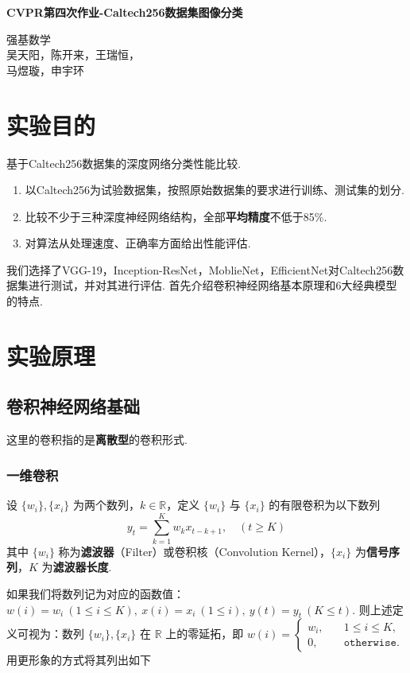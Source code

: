\documentclass[12pt, a4paper, oneside]{ctexart}
\numberwithin{equation}{section}  %
\newenvironment{myTitle}[1]{
    \begin{center}
    {\zihao{-2}\bf #1\\}
    \zihao{-4}\it
}{\end{center}}  %
\begin{document}
\begin{myTitle}{CVPR第四次作业-Caltech256数据集图像分类}
    强基数学\\
    吴天阳，陈开来，王瑞恒，\\
    马煜璇，申宇环
\end{myTitle}
\section{实验目的}
基于Caltech256数据集的深度网络分类性能比较.

\begin{enumerate}
    \item 以Caltech256为试验数据集，按照原始数据集的要求进行训练、测试集的划分.
    \item 比较不少于三种深度神经网络结构，全部\textbf{平均精度}不低于85\%.
    \item 对算法从处理速度、正确率方面给出性能评估.
\end{enumerate}

我们选择了VGG-19，Inception-ResNet，MoblieNet，EfficientNet对Caltech256数据集进行测试，并对其进行评估. 首先介绍卷积神经网络基本原理和6大经典模型的特点.
\section{实验原理}
\subsection{卷积神经网络基础}
这里的卷积指的是\textbf{离散型}的卷积形式.

\subsubsection{一维卷积}

设 \(\{w_i\},\{x_i\}\) 为两个数列，\(k\in\mathbb{R}\)，定义 \(\{w_i\}\)
与 \(\{x_i\}\) 的有限卷积为以下数列
\begin{equation}\label{eq-conv0}
   y_t = \sum_{k=1}^Kw_kx_{t-k+1},\quad(t\geqslant K) 
\end{equation}
其中 \(\{w_i\}\) 称为\textbf{滤波器}（Filter）或卷积核（Convolution
Kernel），\(\{x_i\}\) 为\textbf{信号序列}，\(K\) 为\textbf{滤波器长度}.

如果我们将数列记为对应的函数值：\(w(i) = w_i\ (1\leqslant i\leqslant K),\ x(i) = x_i\ (1\leqslant i),\ y(t) = y_t\ (K\leqslant t)\).
则上述定义可视为：数列 \(\{w_i\}, \{x_i\}\) 在 \(\mathbb{R}\)
上的零延拓，即
\(w(i) = \begin{cases}w_i,&\quad1\leqslant i\leqslant K,\\0,&\quad\texttt{otherwise}.\end{cases}\)
用更形象的方式将其列出如下
\end{document}
